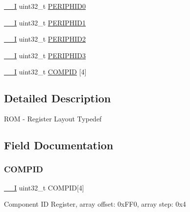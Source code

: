 \begin{DoxyCompactItemize}
\item 
\mbox{\hyperlink{core__cm0plus_8h_af63697ed9952cc71e1225efe205f6cd3}{\+\_\+\+\_\+I}} uint32\+\_\+t \mbox{\hyperlink{struct_r_o_m___type_abccabeeb775d571ffd814f5d21937eab}{P\+E\+R\+I\+P\+H\+I\+D0}}
\item 
\mbox{\hyperlink{core__cm0plus_8h_af63697ed9952cc71e1225efe205f6cd3}{\+\_\+\+\_\+I}} uint32\+\_\+t \mbox{\hyperlink{struct_r_o_m___type_a16ec4a15479493f070d74c29f4e244c5}{P\+E\+R\+I\+P\+H\+I\+D1}}
\item 
\mbox{\hyperlink{core__cm0plus_8h_af63697ed9952cc71e1225efe205f6cd3}{\+\_\+\+\_\+I}} uint32\+\_\+t \mbox{\hyperlink{struct_r_o_m___type_a94da77c610b86d788d32cc8cb6871d23}{P\+E\+R\+I\+P\+H\+I\+D2}}
\item 
\mbox{\hyperlink{core__cm0plus_8h_af63697ed9952cc71e1225efe205f6cd3}{\+\_\+\+\_\+I}} uint32\+\_\+t \mbox{\hyperlink{struct_r_o_m___type_a9ebff4a243ecc983d7f4de875b7669d6}{P\+E\+R\+I\+P\+H\+I\+D3}}
\item 
\mbox{\hyperlink{core__cm0plus_8h_af63697ed9952cc71e1225efe205f6cd3}{\+\_\+\+\_\+I}} uint32\+\_\+t \mbox{\hyperlink{struct_r_o_m___type_af0ce339042860625e784ddae3ef2e2b7}{C\+O\+M\+P\+ID}} \mbox{[}4\mbox{]}
\end{DoxyCompactItemize}


\subsection{Detailed Description}
R\+OM -\/ Register Layout Typedef 

\subsection{Field Documentation}
\mbox{\label{struct_r_o_m___type_af0ce339042860625e784ddae3ef2e2b7}} 
\subsubsection{\texorpdfstring{COMPID}{COMPID}}
{\footnotesize\ttfamily \mbox{\hyperlink{core__cm0plus_8h_af63697ed9952cc71e1225efe205f6cd3}{\+\_\+\+\_\+I}} uint32\+\_\+t C\+O\+M\+P\+ID\mbox{[}4\mbox{]}}

Component ID Register, array offset\+: 0x\+F\+F0, array step\+: 0x4 \mbox{\label{struct_r_o_m___type_ab4d8f70e72a5bd04da9248587c74feaf}} 
